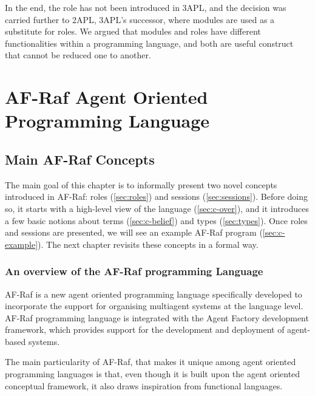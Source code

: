 \documentclass[a4paper,12pt,oneside,fleqn]{book} %
\newcommand{\todo}[1]{[\textcolor{red}{TODO}: #1]}
\begin{document}
In the end, the role has not been introduced in 3APL, and the decision was
carried further to 2APL\cite{DBLP:journals/aamas/Dastani08}, 3APL's
successor, where modules are used as a substitute for roles. We argued that
modules and roles have different functionalities within a programming
language, and both are useful construct that cannot be reduced one to
another.


\part{AF-Raf Agent Oriented Programming Language}\label{part:AF-Raf} %
\chapter{Main AF-Raf Concepts}\label{ch:concepts} %


The main goal of this chapter is to informally present
  two novel concepts introduced in AF-Raf:
  roles (\autoref{sec:roles}) and sessions (\autoref{sec:sessions}).
Before doing so,
  it starts with a high-level view of the language (\autoref{sec:c-over}),
  and it introduces a few basic notions
    about terms (\autoref{sec:c-belief})
    and types (\autoref{sec:types}).
Once roles and sessions are presented,
  we will see an example AF-Raf program (\autoref{sec:c-example}).
The next chapter %
  revisits these concepts in a formal way.

\section{An overview of the AF-Raf programming Language}\label{sec:c-over} %

AF-Raf is a new agent oriented programming language specifically developed
to incorporate the support for organising multiagent systems at the
language level. AF-Raf programming language is integrated with the
Agent Factory development framework, which provides support for the
development and deployment of agent-based systems.

The main particularity of AF-Raf, that makes it unique among agent oriented
programming languages is that, even though it is built upon the agent
oriented conceptual framework, it also draws inspiration from functional
languages.
\end{document}
